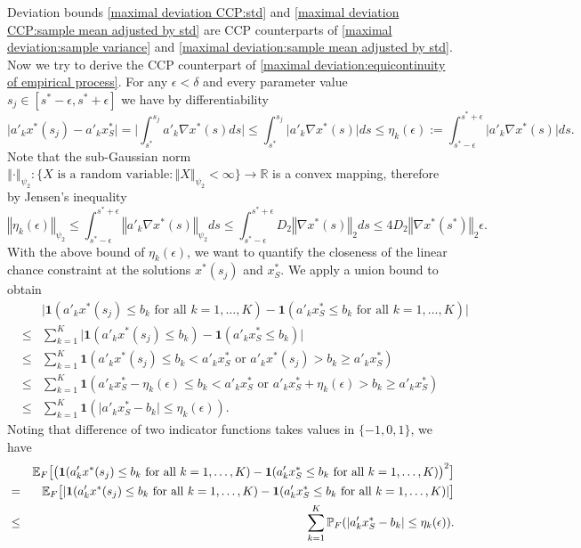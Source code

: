 \documentclass[mnsc,blindrev]{informs4} %
\newcommand{\R}{\mathbb{R}}
\newcommand{\norm}[1]{\left \Vert #1 \right\Vert}
\begin{document}
Deviation bounds \eqref{maximal deviation CCP:std} and \eqref{maximal deviation CCP:sample mean adjusted by std} are CCP counterparts of \eqref{maximal deviation:sample variance} and \eqref{maximal deviation:sample mean adjusted by std}. Now we try to derive the CCP counterpart of \eqref{maximal deviation:equicontinuity of empirical process}. For any $\epsilon<\delta$ and every parameter value $s_j\in [s^*-\epsilon,s^*+\epsilon]$ we have by differentiability
\begin{equation*}
    \lvert a'_kx^*(s_j)-a'_kx^*_S\rvert =\lvert \int_{s^*}^{s_j}a'_k\nabla x^*(s)ds\rvert\leq \int_{s^*}^{s_j}\lvert a'_k\nabla x^*(s)\rvert ds\leq\eta_k(\epsilon):=\int_{s^*-\epsilon}^{s^*+\epsilon}\lvert a'_k\nabla x^*(s)\rvert ds.
\end{equation*}
Note that the sub-Gaussian norm $\norm{\cdot}_{\psi_2}:\{X\text{ is a random variable}:\norm{X}_{\psi_2}<\infty\}\to \R$ is a convex mapping, therefore by Jensen's inequality
\begin{equation*}
    \norm{\eta_k(\epsilon)}_{\psi_2}\leq \int_{s^*-\epsilon}^{s^*+\epsilon}\norm{a'_k\nabla x^*(s)}_{\psi_2} ds\leq \int_{s^*-\epsilon}^{s^*+\epsilon}D_2\norm{\nabla x^*(s)}_2 ds\leq 4D_2\norm{\nabla x^*(s^*)}_2\epsilon.
\end{equation*}
With the above bound of $\eta_k(\epsilon)$, we want to quantify the closeness of the linear chance constraint at the solutions $x^*(s_j)$ and $x^*_S$. We apply a union bound to obtain
\begin{eqnarray*}
    &&\lvert \mathbf{1}(a'_kx^*(s_j)\leq b_k\text{ for all }k=1,\ldots,K)-\mathbf{1}(a'_kx^*_S\leq b_k\text{ for all }k=1,\ldots,K) \rvert\\
    &\leq&\sum_{k=1}^K\lvert \mathbf{1}(a'_kx^*(s_j)\leq b_k)-\mathbf{1}(a'_kx^*_S\leq b_k) \rvert\\
    &\leq &\sum_{k=1}^K\mathbf{1}(a'_kx^*(s_j)\leq b_k<a'_kx^*_S\text{ or }a'_kx^*(s_j)> b_k\geq a'_kx^*_S)\\
    &\leq &\sum_{k=1}^K\mathbf{1}(a'_kx^*_S-\eta_k(\epsilon)\leq b_k<a'_kx^*_S\text{ or }a'_kx^*_S+\eta_k(\epsilon)> b_k\geq a'_kx^*_S)\\
    &\leq &\sum_{k=1}^K\mathbf{1}(\lvert a'_kx^*_S- b_k\rvert\leq \eta_k(\epsilon)).
\end{eqnarray*}
Noting that difference of two indicator functions takes values in $\{-1,0,1\}$, we have
\begin{eqnarray}
    \notag&&\mathbb E_{F}\big[\big(\mathbf{1}(a'_kx^*(s_j)\leq b_k\text{ for all }k=1,\ldots,K)-\mathbf{1}(a'_kx^*_S\leq b_k\text{ for all }k=1,\ldots,K)\big)^2\big]\\
    \notag&=&\mathbb E_{F}\big[\lvert\mathbf{1}(a'_kx^*(s_j)\leq b_k\text{ for all }k=1,\ldots,K)-\mathbf{1}(a'_kx^*_S\leq b_k\text{ for all }k=1,\ldots,K)\rvert\big]\\
    &\leq &\sum_{k=1}^K\mathbb P_F(\lvert a'_kx^*_S- b_k\rvert\leq \eta_k(\epsilon)).\label{local upper bound}
\end{eqnarray}
\end{document}
